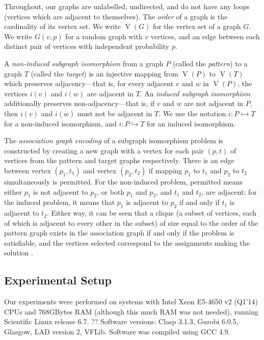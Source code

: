 \documentclass[letterpaper]{article}
\begin{document}
Throughout, our graphs are unlabelled, undirected, and do not have any loops (vertices which are
adjacent to themselves).  The \emph{order} of a graph is the cardinality of its vertex set. We write
$\operatorname{V}(G)$ for the vertex set of a graph $G$.  We write $G(v, p)$ for a random graph with
$v$ vertices, and an edge between each distinct pair of vertices with independent probability $p$.

A \emph{non-induced subgraph isomorphism} from a graph $P$ (called the \emph{pattern}) to a graph
$T$ (called the \emph{target}) is an injective mapping from $\operatorname{V}(P)$ to
$\operatorname{V}(T)$ which preserves adjacency---that is, for every adjacent $v$ and $w$ in
$\operatorname{V}(P)$, the vertices $i(v)$ and $i(w)$ are adjacent in $T$. An \emph{induced subgraph
isomorphism} additionally preserves non-adjacency---that is, if $v$ and $w$ are not adjacent in $P$,
then $i(v)$ and $i(w)$ must not be adjacent in $T$. We use the notation $i : P \rightarrowtail T$
for a non-induced isomorphism, and $i : P \hookrightarrow T$ for an induced isomorphism.

The \emph{association graph encoding} of a subgraph isomorphism problem is constructed by creating a
new graph with a vertex for each pair $(p, t)$ of vertices from the pattern and target graphs
respectively. There is an edge between vertex $(p_1, t_1)$ and vertex $(p_2, t_2)$ if mapping $p_1$
to $t_1$ and $p_2$ to $t_2$ simultaneously is permitted. For the non-induced problem, permitted
means either $p_1$ is not adjacent to $p_2$, or both $p_1$ and $p_2$, and $t_1$ and $t_2$, are
adjacent; for the induced problem, it means that $p_1$ is adjacent to $p_2$ if and only if $t_1$ is
adjacent to $t_2$. Either way, it can be seen that a clique (a subset of vertices, each of which is
adjacent to every other in the subset) of size equal to the order of the pattern graph exists in the
association graph if and only if the problem is satisfiable, and the vertices selected correspond to
the assignments making the solution \citep{Levi:1973}.

\subsection{Experimental Setup}

Our experiments were performed on systems with Intel Xeon E5-4650 v2 (Q1'14) CPUs and 768GBytes RAM
(although this much RAM was not needed), running Scientific Linux release 6.7.   ?? Software
versions: Clasp 3.1.3, Gurobi 6.0.5, Glasgow, LAD version 2, VFLib. Software was compiled using GCC
4.9.
\end{document}
